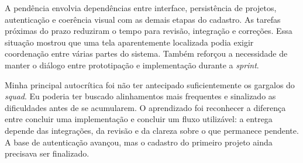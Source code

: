 A pendência envolvia dependências entre interface, persistência de projetos, autenticação e coerência visual com as demais etapas do cadastro. As tarefas próximas do prazo reduziram o tempo para revisão, integração e correções. Essa situação mostrou que uma tela aparentemente localizada podia exigir coordenação entre várias partes do sistema. Também reforçou a necessidade de manter o diálogo entre prototipação e implementação durante a \textit{sprint}.

Minha principal autocrítica foi não ter antecipado suficientemente os gargalos do \textit{squad}. Eu poderia ter buscado alinhamentos mais frequentes e sinalizado as dificuldades antes de se acumularem. O aprendizado foi reconhecer a diferença entre concluir uma implementação e concluir um fluxo utilizável: a entrega depende das integrações, da revisão e da clareza sobre o que permanece pendente. A base de autenticação avançou, mas o cadastro do primeiro projeto ainda precisava ser finalizado.
